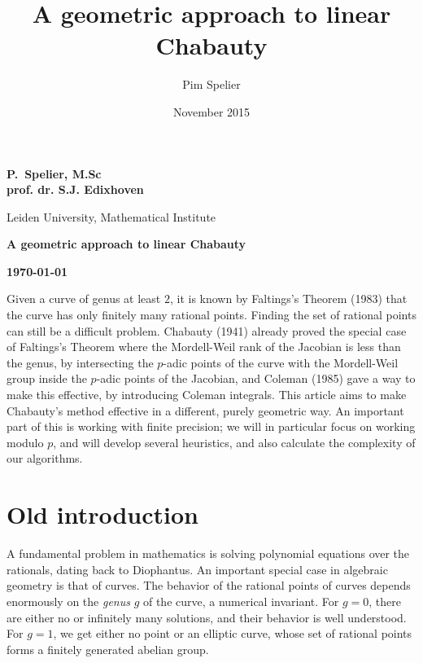 \documentclass[12pt]{article}
\title{A geometric approach to linear Chabauty}
\author{Pim Spelier}
\date{November 2015}
\theoremstyle{plain}
\theoremstyle{definition}
\theoremstyle{remark}
\begin{document}

\vspace*{1em}

\begin{center}

{\Large\bf 
P.\ Spelier, M.Sc\\
prof. dr. S.J. Edixhoven
}

{\sc 
Leiden University, Mathematical Institute\\
} 

\vspace{2em} 

{\LARGE\bf 
A geometric approach to linear Chabauty
} 
\vspace{2em}

{\large\bf 
\today
}

\end{center}

\listoftodos
{}

Given a curve of genus at least $2$, it is known by Faltings's Theorem (1983) that the curve has only finitely many rational points. Finding the set of rational points can still be a difficult problem. Chabauty (1941) already proved the special case of Faltings's Theorem where the Mordell-Weil rank of the Jacobian is less than the genus, by intersecting the $p$-adic points of the curve with the Mordell-Weil group inside the $p$-adic points of the Jacobian, and Coleman (1985) gave a way to make this effective, by introducing Coleman integrals. This article aims to make Chabauty's method effective in a different, purely geometric way. An important part of this is working with finite precision; we will in particular focus on working modulo $p$, and will develop several heuristics, and also calculate the complexity of our algorithms.

\tableofcontents

\section{Old introduction} 
\label{section:intro}
A fundamental problem in mathematics is solving polynomial equations over the rationals, dating back to Diophantus. An important special case in algebraic geometry is that of curves. The behavior of the rational points of curves depends enormously on the \textit{genus} $g$ of the curve, a numerical invariant. For $g = 0$, there are either no or infinitely many solutions, and their behavior is well understood. For $g = 1$, we get either no point or an elliptic curve, whose set of rational points forms a finitely generated abelian group.
\end{document}
